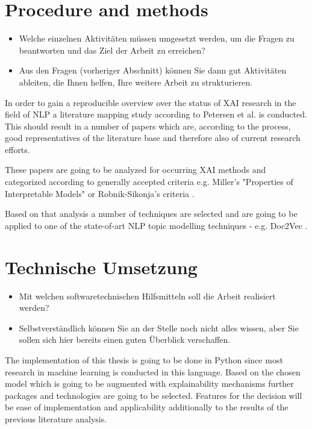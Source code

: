 \documentclass[pdftex,a4paper,12pt]{scrartcl}
\begin{document}
\section{Procedure and methods}
\begin{itemize}
	\item Welche einzelnen Aktivitäten müssen umgesetzt werden, um die Fragen zu beantworten und das Ziel der Arbeit zu erreichen?
	\item Aus den Fragen (vorheriger Abschnitt) können Sie dann gut Aktivitäten ableiten, die Ihnen helfen, Ihre weitere Arbeit zu strukturieren.
	
\end{itemize}

In order to gain a reproducible overview over the status of XAI research in the field of NLP a literature mapping study according to Petersen et al. \cite{petersenSystematicMappingStudies} is conducted. This should result in a number of papers which are, according to the process, good representatives of the literature base and therefore also of current research efforts. 

These papers are going to be analyzed for occurring XAI methods and categorized according to generally accepted criteria e.g. Miller's "Properties of Interpretable Models" \cite{liptonMythosModelInterpretability2016} or Robnik-Sikonja's criteria \cite{robnik-sikonjaPerturbationBasedExplanationsPrediction2018}.

Based on that analysis a number of techniques are selected and are going to be applied to one of the state-of-art NLP topic modelling techniques - e.g. Doc2Vec \cite{leDistributedRepresentationsSentences2014}.

\section{Technische Umsetzung}
\begin{itemize}
	\item Mit welchen softwaretechnischen Hilfsmitteln soll die Arbeit realisiert werden?
	\item Selbstverständlich können Sie an der Stelle noch nicht alles wissen, aber Sie sollen sich hier bereits einen guten Überblick verschaffen.
\end{itemize}

The implementation of this thesis is going to be done in Python since most research in machine learning is conducted in this language. Based on the chosen model which is going to be augmented with explainability mechanisms further packages and technologies are going to be selected. Features for the decision will be ease of implementation and applicability additionally to the results of the previous literature analysis.
\end{document}

